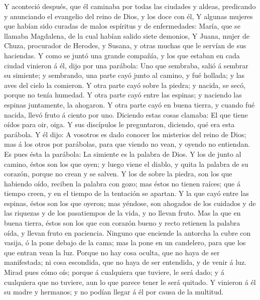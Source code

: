  Y aconteció después, que él caminaba por todas las
ciudades y aldeas, predicando y anunciando el evangelio del reino de
Dios, y los doce con él,  Y algunas mujeres que habían
sido curadas de malos espíritus y de enfermedades: María, que se llamaba
Magdalena, de la cual habían salido siete demonios,  Y
Juana, mujer de Chuza, procurador de Herodes, y Susana, y otras muchas
que le servían de sus haciendas.  Y como se juntó una
grande compañía, y los que estaban en cada ciudad vinieron á él, dijo
por una parábola:  Uno que sembraba, salió á sembrar su
simiente; y sembrando, una parte cayó junto al camino, y fué hollada; y
las aves del cielo la comieron.  Y otra parte cayó sobre
la piedra; y nacida, se secó, porque no tenía humedad.  Y
otra parte cayó entre las espinas; y naciendo las espinas juntamente, la
ahogaron.  Y otra parte cayó en buena tierra, y cuando fué
nacida, llevó fruto á ciento por uno. Diciendo estas cosas clamaba: El
que tiene oídos para oir, oiga.  Y sus discípulos le
preguntaron, diciendo, qué era esta parábola.  Y él dijo:
A vosotros es dado conocer los misterios del reino de Dios; mas á los
otros por parábolas, para que viendo no vean, y oyendo no entiendan.
 Es pues ésta la parábola: La simiente es la palabra de
Dios.  Y los de junto al camino, éstos son los que oyen;
y luego viene el diablo, y quita la palabra de su corazón, porque no
crean y se salven.  Y los de sobre la piedra, son los que
habiendo oído, reciben la palabra con gozo; mas éstos no tienen raíces;
que á tiempo creen, y en el tiempo de la tentación se apartan.
 Y la que cayó entre las espinas, éstos son los que
oyeron; mas yéndose, son ahogados de los cuidados y de las riquezas y de
los pasatiempos de la vida, y no llevan fruto.  Mas la
que en buena tierra, éstos son los que con corazón bueno y recto
retienen la palabra oída, y llevan fruto en paciencia. 
Ninguno que enciende la antorcha la cubre con vasija, ó la pone debajo
de la cama; mas la pone en un candelero, para que los que entran vean la
luz.  Porque no hay cosa oculta, que no haya de ser
manifestada; ni cosa escondida, que no haya de ser entendida, y de venir
á luz.  Mirad pues cómo oís; porque á cualquiera que
tuviere, le será dado; y á cualquiera que no tuviere, aun lo que parece
tener le será quitado.  Y vinieron á él su madre y
hermanos; y no podían llegar á él por causa de la multitud.
